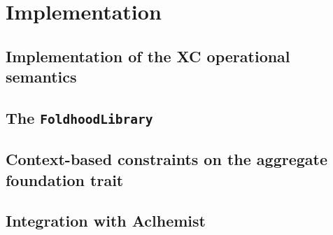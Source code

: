 \chapter{Implementation}
\label{chap:implementation}

\section{Implementation of the XC operational semantics} \label{chap:implementation->sec:xc-ops}

\section{The \texttt{FoldhoodLibrary}}

\section{Context-based constraints on the aggregate foundation trait}

\section{Integration with Aclhemist}
